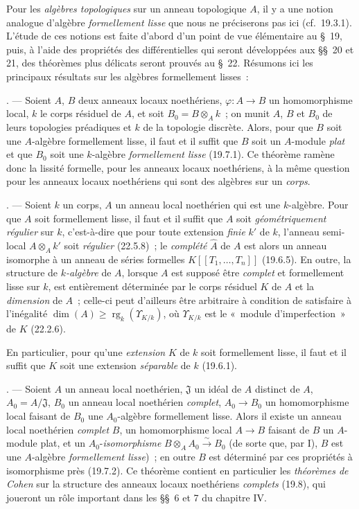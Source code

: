 \begin{env}[19.0.2]
\label{0.19.0.2-fr}
Pour les \emph{algèbres topologiques} sur un anneau topologique $A$, il y a une
notion analogue d'algèbre \emph{formellement lisse} que nous ne préciserons pas
ici (cf.~19.3.1). L'étude de ces notions est faite d'abord d'un point de vue
élémentaire au §~19, puis, à l'aide des propriétés des différentielles qui
seront développées aux §§~20 et 21, des théorèmes plus délicats seront prouvés
au §~22. Résumons ici les principaux résultats sur les algèbres formellement
lisses~:

\medskip\noindentI. --- Soient $A$, $B$ deux anneaux locaux
noethériens, $\varphi:A\to B$ un homomorphisme local, $k$ le corps résiduel de
$A$, et soit $B_0=B\otimes_A k$~; on munit $A$, $B$ et $B_0$ de leurs
topologies préadiques et $k$ de la topologie discrète. Alors, pour que $B$ soit
une $A$-algèbre formellement lisse, il faut et il suffit que $B$ soit un
$A$-module \emph{plat} et que $B_0$ soit une $k$-algèbre \emph{formellement
lisse} (19.7.1). Ce théorème ramène donc la lissité formelle, pour les anneaux
locaux noethériens, à la même question pour les anneaux locaux noethériens qui
sont des algèbres sur un \emph{corps}.

\medskip\noindentII. --- Soient $k$ un corps, $A$ un anneau local
noethérien qui est une $k$-algèbre. Pour que $A$ soit formellement lisse, il
faut et il suffit que $A$ soit \emph{géométriquement régulier} sur $k$,
c'est-à-dire que pour toute extension \emph{finie} $k'$ de $k$, l'anneau
semi-local $A\otimes_A k'$ soit
\emph{régulier} (22.5.8)~; le \emph{complété} $\widehat A$ de $A$ est alors
un anneau isomorphe à un anneau de séries formelles
$K[[T_1,\ldots,T_n]]$ (19.6.5). En outre, la structure de \emph{$k$-algèbre} de $A$,
lorsque $A$ est supposé être \emph{complet} et formellement lisse sur $k$, est
entièrement déterminée par le corps résiduel $K$ de $A$ et la \emph{dimension}
de $A$~; celle-ci peut d'ailleurs être arbitraire à condition de satisfaire à
l'inégalité
$\dim(A)\geq \operatorname{rg}_k(\Upsilon_{K/k})$,
où $\Upsilon_{K/k}$ est le «~module d'imperfection~» de $K$ (22.2.6).

En particulier, pour qu'une \emph{extension} $K$ de $k$ soit formellement
lisse, il faut et il suffit que $K$ soit une extension \emph{séparable} de $k$
(19.6.1).

\medskip\noindentIII. --- Soient $A$ un anneau local noethérien,
$\mathfrak J$ un idéal de $A$ distinct de $A$, $A_0=A/\mathfrak J$, $B_0$ un
anneau local noethérien \emph{complet}, $A_0\to B_0$ un homomorphisme local
faisant de $B_0$ une $A_0$-algèbre formellement lisse. Alors il existe un
anneau local noethérien \emph{complet} $B$, un homomorphisme local $A\to B$
faisant de $B$ un $A$-module plat, et un $A_0$-\emph{isomorphisme}
$B\otimes_A A_0\xrightarrow{\sim}B_0$
(de sorte que, par I), $B$ est une $A$-algèbre \emph{formellement lisse})~; en
outre $B$ est déterminé par ces propriétés à isomorphisme près (19.7.2). Ce
théorème contient en particulier les \emph{théorèmes de Cohen} sur la structure
des anneaux locaux noethériens \emph{complets} (19.8), qui joueront un rôle
important dans les §§~6 et 7 du chapitre IV.


\end{env}
